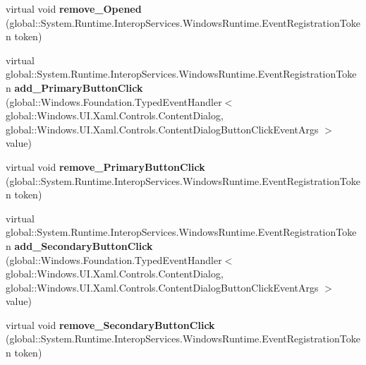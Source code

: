 \begin{DoxyCompactItemize}
\item 
\mbox{\label{class_windows_1_1_u_i_1_1_xaml_1_1_controls_1_1_content_dialog_aca373dad7a49f1f4e1bd7b41f5ea7703}} 
virtual void {\bfseries remove\+\_\+\+Opened} (global\+::\+System.\+Runtime.\+Interop\+Services.\+Windows\+Runtime.\+Event\+Registration\+Token token)
\item 
\mbox{\label{class_windows_1_1_u_i_1_1_xaml_1_1_controls_1_1_content_dialog_a3e36b19b3f4893d9fb0f02a0521e5d93}} 
virtual global\+::\+System.\+Runtime.\+Interop\+Services.\+Windows\+Runtime.\+Event\+Registration\+Token {\bfseries add\+\_\+\+Primary\+Button\+Click} (global\+::\+Windows.\+Foundation.\+Typed\+Event\+Handler$<$ global\+::\+Windows.\+U\+I.\+Xaml.\+Controls.\+Content\+Dialog, global\+::\+Windows.\+U\+I.\+Xaml.\+Controls.\+Content\+Dialog\+Button\+Click\+Event\+Args $>$ value)
\item 
\mbox{\label{class_windows_1_1_u_i_1_1_xaml_1_1_controls_1_1_content_dialog_ad87d51f3f0f3f6e07586f13e8912c5dc}} 
virtual void {\bfseries remove\+\_\+\+Primary\+Button\+Click} (global\+::\+System.\+Runtime.\+Interop\+Services.\+Windows\+Runtime.\+Event\+Registration\+Token token)
\item 
\mbox{\label{class_windows_1_1_u_i_1_1_xaml_1_1_controls_1_1_content_dialog_aa769bea5ba29f6714032e97410b15b2f}} 
virtual global\+::\+System.\+Runtime.\+Interop\+Services.\+Windows\+Runtime.\+Event\+Registration\+Token {\bfseries add\+\_\+\+Secondary\+Button\+Click} (global\+::\+Windows.\+Foundation.\+Typed\+Event\+Handler$<$ global\+::\+Windows.\+U\+I.\+Xaml.\+Controls.\+Content\+Dialog, global\+::\+Windows.\+U\+I.\+Xaml.\+Controls.\+Content\+Dialog\+Button\+Click\+Event\+Args $>$ value)
\item 
\mbox{\label{class_windows_1_1_u_i_1_1_xaml_1_1_controls_1_1_content_dialog_a3dfa1680cb30bf0dc1f3402bc879912e}} 
virtual void {\bfseries remove\+\_\+\+Secondary\+Button\+Click} (global\+::\+System.\+Runtime.\+Interop\+Services.\+Windows\+Runtime.\+Event\+Registration\+Token token)
\item 

\end{DoxyCompactItemize}
